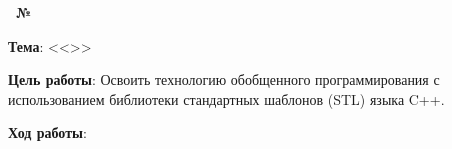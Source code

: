 \begin{center}
    \textbf{\titlePageWorkType~№\titlePageWorkNumber}
\end{center}

\textbf{Тема}: <<\titlePageTopic>>

\textbf{Цель работы}:
Освоить технологию обобщенного программирования с использованием библиотеки стандартных шаблонов (STL) языка C++. 

\begin{center}
    \textbf{Ход работы}:
\end{center}


